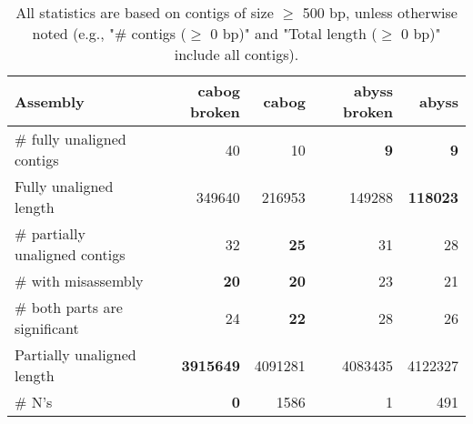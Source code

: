 \documentclass[12pt,a4paper]{article}
\begin{document}
\begin{table}[ht]
\begin{center}
\caption{All statistics are based on contigs of size $\geq$ 500 bp, unless otherwise noted (e.g., "\# contigs ($\geq$ 0 bp)" and "Total length ($\geq$ 0 bp)" include all contigs).}
\begin{tabular}{|l*{4}{|r}|}
\hline
Assembly & cabog broken & cabog & abyss broken & abyss \\ \hline
\# fully unaligned contigs & 40 & 10 & {\bf 9} & {\bf 9} \\ \hline
Fully unaligned length & 349640 & 216953 & 149288 & {\bf 118023} \\ \hline
\# partially unaligned contigs & 32 & {\bf 25} & 31 & 28 \\ \hline
\hspace{5mm}\# with misassembly & {\bf 20} & {\bf 20} & 23 & 21 \\ \hline
\hspace{5mm}\# both parts are significant & 24 & {\bf 22} & 28 & 26 \\ \hline
Partially unaligned length & {\bf 3915649} & 4091281 & 4083435 & 4122327 \\ \hline
\# N's & {\bf 0} & 1586 & 1 & 491 \\ \hline
\end{tabular}
\end{center}
\end{table}
\end{document}
